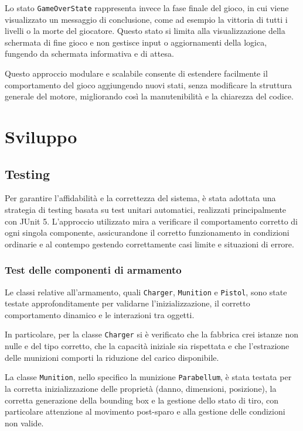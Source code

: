 \documentclass[a4paper,12pt]{report}
\begin{document}
Lo stato \texttt{GameOverState} rappresenta invece la fase finale del gioco, in cui viene visualizzato un messaggio di conclusione, come ad esempio la vittoria di tutti i livelli o la morte del giocatore. Questo stato si limita alla visualizzazione della schermata di fine gioco e non gestisce input o aggiornamenti della logica, fungendo da schermata informativa e di attesa.

Questo approccio modulare e scalabile consente di estendere facilmente il comportamento del gioco aggiungendo nuovi stati, senza modificare la struttura generale del motore, migliorando così la manutenibilità e la chiarezza del codice.

\chapter{Sviluppo}

\section{Testing}

Per garantire l'affidabilità e la correttezza del sistema, è stata adottata una strategia di testing basata su test unitari automatici, realizzati principalmente con JUnit 5. L'approccio utilizzato mira a verificare il comportamento corretto di ogni singola componente, assicurandone il corretto funzionamento in condizioni ordinarie e al contempo gestendo correttamente casi limite e situazioni di errore.

\subsection{Test delle componenti di armamento}

Le classi relative all'armamento, quali \texttt{Charger}, \texttt{Munition} e \texttt{Pistol}, sono state testate approfonditamente per validarne l'inizializzazione, il corretto comportamento dinamico e le interazioni tra oggetti.

In particolare, per la classe \texttt{Charger} si è verificato che la fabbrica crei istanze non nulle e del tipo corretto, che la capacità iniziale sia rispettata e che l'estrazione delle munizioni comporti la riduzione del carico disponibile.

La classe \texttt{Munition}, nello specifico la munizione \texttt{Parabellum}, è stata testata per la corretta inizializzazione delle proprietà (danno, dimensioni, posizione), la corretta generazione della bounding box e la gestione dello stato di tiro, con particolare attenzione al movimento post-sparo e alla gestione delle condizioni non valide.
\end{document}
